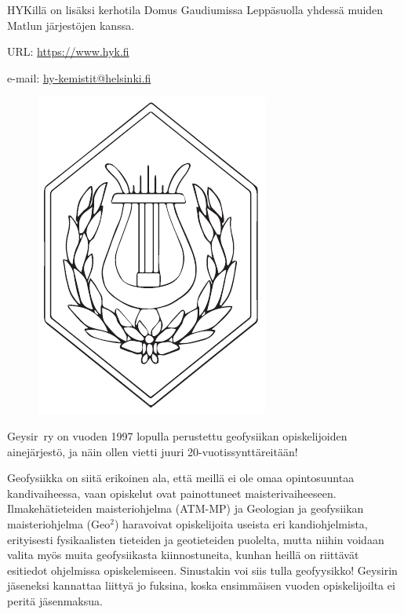 \documentclass[a5paper, 8pt, twocolumn]{book} %
\numberwithin{equation}{section}
\begin{document}
HYKillä on lisäksi kerhotila Domus Gaudiumissa
Leppäsuolla yhdessä muiden Matlun järjestöjen kanssa.

\noindent URL: \url{https://www.hyk.fi}

\noindent e-mail: \url{hy-kemistit@helsinki.fi}

\begin{figure}[!b]
	\centering
	\includegraphics[width=0.8\columnwidth]{hyklogo.png}
\end{figure}

Geysir~ry on vuoden 1997 lopulla perustettu
geofysiikan opiskelijoiden ainejärjestö,
ja näin ollen vietti juuri 20-vuotissynttäreitään! 

Geofysiikka on siitä erikoinen ala, että meillä ei ole omaa opintosuuntaa kandivaiheessa, vaan opiskelut ovat painottuneet maisterivaiheeseen. Ilmakehä\-tieteiden maisteri\-ohjelma (ATM-MP) ja Geologian ja geo\-fysiikan maisteri\-ohjelma (Geo$^2$) haravoivat opiskelijoita useista eri kandi\-ohjelmista, erityisesti fysikaalisten tieteiden ja geo\-tieteiden puolelta, mutta niihin voidaan valita myös muita geo\-fysiikasta kiinnostuneita, kunhan heillä on riittävät esitiedot ohjelmissa opiskelemiseen. Sinustakin voi siis tulla geo\-fyysikko! Geysirin jäseneksi
kannattaa liittyä jo fuksina, koska ensimmäisen
vuoden opiskelijoilta ei peritä jäsen\-maksua.
\end{document}
